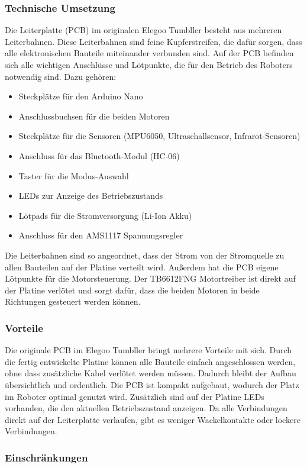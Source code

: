 \subsubsection{Technische Umsetzung}
Die Leiterplatte (PCB) im originalen Elegoo Tumbller besteht aus mehreren Leiterbahnen. Diese Leiterbahnen sind feine Kupferstreifen, die dafür sorgen, dass alle elektronischen Bauteile miteinander verbunden sind.
Auf der PCB befinden sich alle wichtigen Anschlüsse und Lötpunkte, die für den Betrieb des Roboters notwendig sind. Dazu gehören:
\begin{itemize}
    \item Steckplätze für den Arduino Nano
    \item Anschlussbuchsen für die beiden Motoren
    \item Steckplätze für die Sensoren (MPU6050, Ultraschallsensor, Infrarot-Sensoren)
    \item Anschluss für das Bluetooth-Modul (HC-06)
    \item Taster für die Modus-Auswahl
    \item LEDs zur Anzeige des Betriebszustands
    \item Lötpads für die Stromversorgung (Li-Ion Akku)
    \item Anschluss für den AMS1117 Spannungsregler
\end{itemize}

Die Leiterbahnen sind so angeordnet, dass der Strom von der Stromquelle zu allen Bauteilen auf der Platine verteilt wird.
Außerdem hat die PCB eigene Lötpunkte für die Motorsteuerung. Der TB6612FNG Motortreiber ist direkt auf der Platine verlötet und sorgt dafür, dass die beiden Motoren in beide Richtungen gesteuert werden können.
\subsubsection{Vorteile}
Die originale PCB im Elegoo Tumbller bringt mehrere Vorteile mit sich.
Durch die fertig entwickelte Platine können alle Bauteile einfach angeschlossen werden, ohne dass zusätzliche Kabel verlötet werden müssen.
Dadurch bleibt der Aufbau übersichtlich und ordentlich.
Die PCB ist kompakt aufgebaut, wodurch der Platz im Roboter optimal genutzt wird.
Zusätzlich sind auf der Platine LEDs vorhanden, die den aktuellen Betriebszustand anzeigen.
Da alle Verbindungen direkt auf der Leiterplatte verlaufen, gibt es weniger Wackelkontakte oder lockere Verbindungen.

\subsubsection{Einschränkungen}

